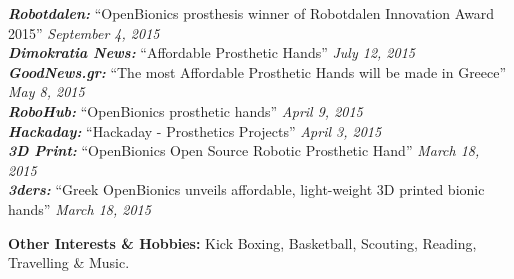 \documentclass[11pt]{res} %
\begin{document}
\begin{resume}
\vspace{5pt} %
{\it\small\textbf{Robotdalen:}}
``OpenBionics prosthesis winner of Robotdalen Innovation Award 2015'' \hfill{\it September 4, 2015}\\
{\it\small\textbf{Dimokratia News:}}
``Affordable Prosthetic Hands'' \hfill{\it July 12, 2015}\\
{\it\small\textbf{GoodNews.gr:}}
``The most Affordable Prosthetic Hands will be made in Greece'' \hfill{\it May 8, 2015}\\
{\it\small\textbf{RoboHub:}} %
``OpenBionics prosthetic hands''
\hfill{\it April 9, 2015}\\
{\it\small\textbf{Hackaday:}} %
``Hackaday - Prosthetics Projects''
\hfill{\it April 3, 2015}\\
{\it\small\textbf{3D Print:}} %
``OpenBionics Open Source Robotic Prosthetic Hand''
\hfill{\it March 18, 2015}\\
{\it\small\textbf{3ders:}} %
``Greek OpenBionics unveils affordable, light-weight 3D printed bionic hands''
\hfill{\it March 18, 2015}\\

\vspace{0in} %

\textbf{Other Interests \& Hobbies:} Kick Boxing, Basketball, Scouting, Reading, Travelling \& Music.
 

\end{resume} 
\end{document}
